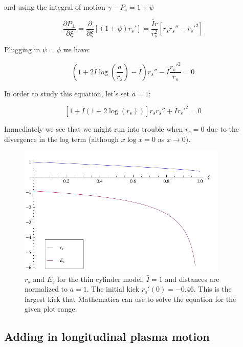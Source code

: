 \documentclass[aps,prl,preprint,groupedaddress]{revtex4-1}
\begin{document}
and using the integral of motion $\gamma - P_z = 1 + \psi$

\begin{equation}\label{eq:EOM}
\frac{\partial P_{\perp}}{\partial \xi} = \frac{\partial}{\partial \xi}[(1+\psi)r_s'] = \frac{\bar{I} r}{r_s^2}[r_s r_s'' - r_s'^2] 
\end{equation}

Plugging in $\psi = \phi$ we have:

\begin{equation}\label{eq:rs}
\left(1+2\bar{I}\log\left(\frac{a}{r_s}\right) - \bar{I}\right)r_s'' -\bar{I}\frac{r_s'^2}{r_s} = 0
\end{equation}

In order to study this equation, let's set $a=1$:

\begin{equation}\label{eq:rs_simp}
[1+\bar{I}(1+2\log(r_s))] r_s r_s'' + \bar{I}r_s'^2 = 0
\end{equation}

Immediately we see that we might run into trouble when $r_s = 0$ due to the divergence in the log term (although $x\log x = 0$ as $x\rightarrow0$).

\begin{figure}[ht]\label{fig:sheath}
  \centering
    \includegraphics[width=100mm]{./figures/sheath.pdf}
      \caption{$r_s$ and $E_z$ for the thin cylinder model. $\bar{I} = 1$ and distances are normalized to $a=1$. The initial kick $r_s'(0) = -0.46$. This is the largest kick that Mathematica can use to solve the equation for the given plot range.}
\end{figure}

\subsection{Adding in longitudinal plasma motion}
\end{document}
